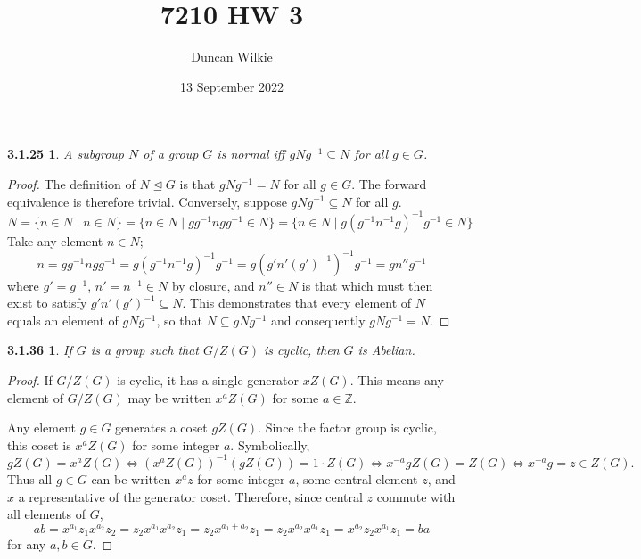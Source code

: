 \documentclass{article}
\title{7210 HW 3}
\author{Duncan Wilkie}
\date{13 September 2022}
\newtheorem*{3.1.25}{3.1.25}
\newtheorem*{3.1.36}{3.1.36}
\begin{document}
\maketitle

\begin{3.1.25}
  A subgroup $N$ of a group $G$ is normal iff $gNg^{-1}\subseteq N$ for all $g\in G$.
\end{3.1.25}

\begin{proof}
  The definition of $N \trianglelefteq G$ is that $gNg^{-1} = N$ for all $g \in G$.
  The forward equivalence is therefore trivial.
  Conversely, suppose $gNg^{-1} \subseteq N$ for all $g$.
  \[
    N = \{n \in N \mid n \in N\} = \{n \in N \mid gg^{-1}ngg^{-1} \in N\} = \{n \in N \mid g\left( g^{-1}n^{-1}g \right)^{-1}g^{-1} \in N\}
  \]
  Take any element $n \in N$;
  \[
    n = gg^{-1}ngg^{-1} = g(g^{-1}n^{-1}g)^{-1}g^{-1} = g(g'n'(g')^{-1})^{-1}g^{-1} = gn''g^{-1}
  \]
  where $g' = g^{-1}$, $n' = n^{-1} \in N$ by closure, and $n'' \in N$ is that which must then exist to satisfy $g'n'(g')^{-1} \subseteq N$.
  This demonstrates that every element of $N$ equals an element of $gNg^{-1}$, so that $N \subseteq gNg^{-1}$ and consequently $gNg^{-1} = N$.
\end{proof}

\begin{3.1.36}
  If $G$ is a group such that $G / Z(G)$ is cyclic, then $G$ is Abelian.
\end{3.1.36}

\begin{proof}
  If $G / Z(G)$ is cyclic, it has a single generator $xZ(G)$.
  This means any element of $G / Z(G)$ may be written $x^{a}Z(G)$ for some $a \in \mathbb{Z}$.

  Any element $g\in G$ generates a coset $gZ(G)$.
  Since the factor group is cyclic, this coset is $x^{a}Z(G)$ for some integer $a$.
  Symbolically,
  \[
    gZ(G) = x^{a}Z(G) \Leftrightarrow (x^{a}Z(G))^{-1}(gZ(G)) = 1 \cdot Z(G) \Leftrightarrow x^{-a}gZ(G) = Z(G)
    \Leftrightarrow x^{-a}g = z \in Z(G).
  \]
  Thus all $g\in G$ can be written $x^{a}z$ for some integer $a$, some central element $z$, and $x$ a representative of the generator coset.
  Therefore, since central $z$ commute with all elements of $G$,
  \[
    ab = x^{a_{1}}z_{1}x^{a_{2}}z_{2} = z_{2}x^{a_{1}}x^{a_{2}}z_{1} = z_{2}x^{a_{1}+a_{2}}z_{1} = z_{2}x^{a_{2}}x^{a_{1}}z_{1}
    = x^{a_{2}}z_{2}x^{a_{1}}z_{1} = ba
  \]
  for any $a,b \in G$.
\end{proof}
\end{document}
